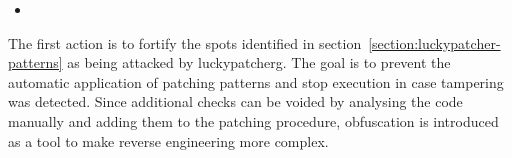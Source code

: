 \begin{itemize}
  \item
\end{itemize}
The first action is to fortify the spots identified in section~\ref{section:luckypatcher-patterns} as being attacked by \gls{luckypatcherg}.
The goal is to prevent the automatic application of patching patterns and stop execution in case tampering was detected.
Since additional checks can be voided by analysing the code manually and adding them to the patching procedure, obfuscation is introduced as a tool to make reverse engineering more complex.
